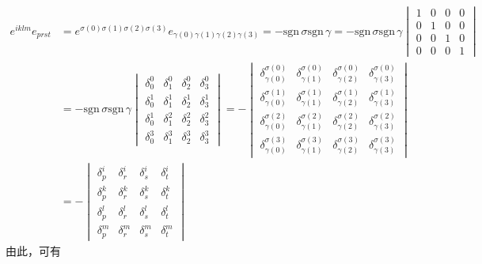 \begin{align*}
	e^{iklm}e_{prst} & = e^{\sigma(0)\sigma(1)\sigma(2)\sigma(3)} e_{\gamma(0)\gamma(1)\gamma(2)\gamma(3)} = -\mathrm{sgn}\,\sigma \mathrm{sgn}\,\gamma = -\mathrm{sgn}\,\sigma \mathrm{sgn}\,\gamma \begin{vmatrix} 1 & 0 & 0 & 0 \\ 0 & 1 & 0 & 0 \\ 0 & 0 & 1 & 0 \\ 0 & 0 & 0 & 1 \end{vmatrix} \\
	& = -\mathrm{sgn}\,\sigma \mathrm{sgn}\,\gamma \begin{vmatrix} \delta^0_0 & \delta^0_1 & \delta^0_2 & \delta^0_3 \\ \delta^1_0 & \delta^1_1 & \delta^1_2 & \delta^1_3 \\ \delta^1_0 & \delta^2_1 & \delta^2_2 & \delta^2_3 \\ \delta^3_0 & \delta^3_1 & \delta^3_2 & \delta^3_3 \end{vmatrix} = - \begin{vmatrix} \delta^{\sigma(0)}_{\gamma(0)} & \delta^{\sigma(0)}_{\gamma(1)} & \delta^{\sigma(0)}_{\gamma(2)} & \delta^{\sigma(0)}_{\gamma(3)} \\ \delta^{\sigma(1)}_{\gamma(0)} & \delta^{\sigma(1)}_{\gamma(1)} & \delta^{\sigma(1)}_{\gamma(2)} & \delta^{\sigma(1)}_{\gamma(3)} \\ \delta^{\sigma(2)}_{\gamma(0)} & \delta^{\sigma(2)}_{\gamma(1)} & \delta^{\sigma(2)}_{\gamma(2)} & \delta^{\sigma(2)}_{\gamma(3)} \\ \delta^{\sigma(3)}_{\gamma(0)} & \delta^{\sigma(3)}_{\gamma(1)} & \delta^{\sigma(3)}_{\gamma(2)} & \delta^{\sigma(3)}_{\gamma(3)} \end{vmatrix} \\
	& = -\begin{vmatrix} \delta^i_p & \delta^i_r & \delta^i_s & \delta^i_t \\ \delta^k_p & \delta^k_r & \delta^k_s & \delta^k_t \\ \delta^l_p & \delta^l_r & \delta^l_s & \delta^l_t \\ \delta^m_p & \delta^m_r & \delta^m_s & \delta^m_t \end{vmatrix}
\end{align*}
由此，可有
